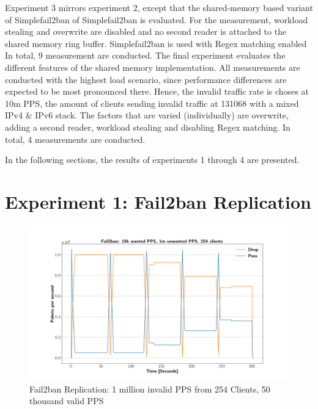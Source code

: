 Experiment 3 mirrors experiment 2, except that the shared-memory based variant of Simplefail2ban of Simplefail2ban is evaluated. For the
measurement, workload stealing and overwrite are disabled and no second reader is attached to the shared memory ring buffer. Simplefail2ban is used with \ac{Regex} matching enabled In total, 9 measurement are conducted.    
The final experiment evaluates the different features of the shared memory implementation. All measurements are conducted with the highest load scenario, since performance 
differences are expected to be most pronounced there. Hence, the invalid traffic rate is choses at 10m \ac{PPS}, the amount of clients sending invalid traffic at 131068
with a mixed \ac{IPv4} \& \ac{IPv6} stack. The factors that are varied (individually) are overwrite, adding a second reader, workload stealing and disabling \ac{Regex} matching.
In total, 4 measurements are conducted.    
\par
In the following sections, the results of experiments 1 through 4 are presented.

\section{Experiment 1: Fail2ban Replication}

\begin{figure}[h!]
    \centerline{\includegraphics[width=1.2\textwidth]{images/fail2ban_v50k_iv1m_c254.png}}
    \caption[Fail2ban Replication: 1m PPS, 254 Clients]{Fail2ban Replication: 1 million invalid \ac{PPS} from 254 Clients, 50 thousand valid \ac{PPS}}
	\label{fig:fail2ban:1m}
\end{figure}

